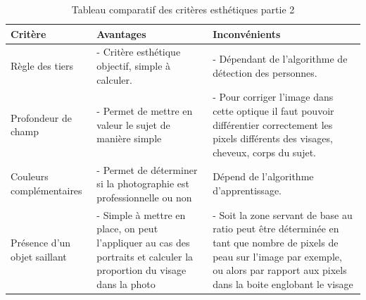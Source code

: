 \documentclass[11pt, french,screen]{report-rd-info}
\begin{document}
\begin{table}
\begin{center}
\begin{tabular}{|p{3cm}|p{6cm}|p{7cm}|}
\hline
\textbf{Critère} & \textbf{Avantages} & \textbf{Inconvénients} \\ \hline
Règle des tiers & - Critère esthétique objectif, simple à calculer. & - Dépendant de l'algorithme de détection des personnes. \\ \hline
Profondeur de champ & - Permet de mettre en valeur le sujet de manière simple & - Pour corriger l'image dans cette optique il faut pouvoir différentier correctement les pixels différents des visages, cheveux, corps du sujet. \\ \hline
Couleurs complémentaires & - Permet de déterminer si la photographie est professionnelle ou non & Dépend de l’algorithme d'apprentissage. \\ \hline
Présence d'un objet saillant & - Simple à mettre en place, on peut l'appliquer au cas des portraits et calculer la proportion du visage dans la photo & - Soit la zone servant de base au ratio peut être déterminée en tant que nombre de pixels de peau sur l'image par exemple, ou alors par rapport aux pixels dans la boite englobant le visage \\ \hline
\end{tabular}
\end{center}
\caption{Tableau comparatif des critères esthétiques partie 2}
\label{tab:ComparaisonCriteres2}
\end{table}
\end{document}
